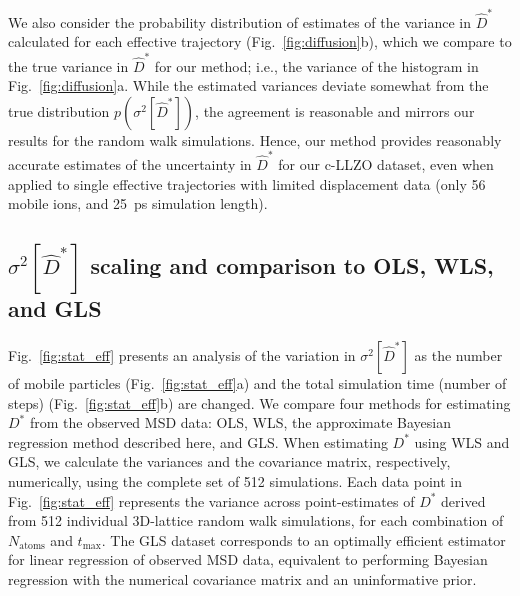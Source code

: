 \documentclass[reprint,superscriptaddress,nobibnotes,amsmath,amssymb,aps,prx,hidelinks,linenumbers]{revtex4-2}
\newcommand{\prob}[1]{\ensuremath{p(#1)}}
\newcommand{\Dest}{\ensuremath{\widehat{D}^*}}
\newcommand{\D}{\ensuremath{D^*}}
\newcommand{\var}[1]{\ensuremath{\sigma^2[#1]}}
\begin{document}
We also consider the probability distribution of estimates of the variance in $\Dest$ calculated for each effective trajectory (Fig.~\ref{fig:diffusion}b), which we compare to the true variance in $\Dest$ for our method; i.e., the variance of the histogram in Fig.~\ref{fig:diffusion}a.
While the estimated variances deviate somewhat from the true distribution $\prob{\var{\Dest}}$, the agreement is reasonable and mirrors our results for the random walk simulations.
Hence, our method provides reasonably accurate estimates of the uncertainty in $\Dest$ for our c-LLZO dataset, even when applied to single effective trajectories with limited displacement data (only 56 mobile ions, and \SI{25}{ps} simulation length).

\subsection{$\var{\Dest}$ scaling and comparison to OLS, WLS, and GLS}


Fig.~\ref{fig:stat_eff} presents an analysis of the variation in $\var{\Dest}$ as the number of mobile particles (Fig.~\ref{fig:stat_eff}a) and the total simulation time (number of steps) (Fig.~\ref{fig:stat_eff}b) are changed.
We compare four methods for estimating $\D$ from the observed MSD data: OLS, WLS, the approximate Bayesian regression method described here, and GLS.
When estimating $\D$ using WLS and GLS, we calculate the variances and the covariance matrix, respectively, numerically, using the complete set of \num{512} simulations.
Each data point in Fig.~\ref{fig:stat_eff} represents the variance across point-estimates of $\D$ derived from \num{512} individual 3D-lattice random walk simulations, for each combination of $N_\mathrm{atoms}$ and $t_\mathrm{max}$.
The GLS dataset corresponds to an optimally efficient estimator for linear regression of observed MSD data, equivalent to performing Bayesian regression with the numerical covariance matrix and an uninformative prior.
\end{document}
